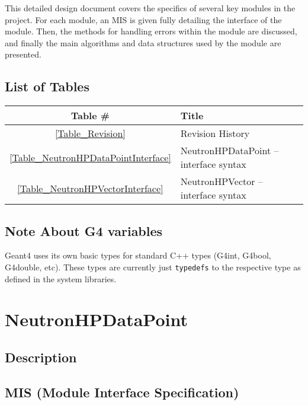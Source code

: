 \documentclass[12pt]{article}
\begin{document}
This detailed design document covers the specifics of several key modules in the project. For each module, an MIS is given fully detailing the interface of the module. Then, the methods for handling errors within the module are discussed, and finally the main algorithms and data structures used by the module are presented.

\subsection{List of Tables}
\begin{center}
\begin{tabular}{cl}
\toprule
\bf Table \# & \bf Title\\\midrule
\ref{Table_Revision} & Revision History\\
\ref{Table_NeutronHPDataPointInterface} & NeutronHPDataPoint -- interface syntax\\
\ref{Table_NeutronHPVectorInterface} & NeutronHPVector -- interface syntax\\
\bottomrule
\end{tabular}
\end{center}

\subsection{Note About G4 variables}
Geant4 uses its own basic types for standard C++ types (G4int, G4bool, G4double, etc). These types are currently just \texttt{typedefs} to the respective type as defined in the system libraries.


\section{NeutronHPDataPoint}
\subsection{Description}

\subsection{MIS (Module Interface Specification)}
\end{document}
